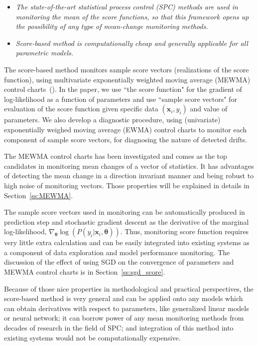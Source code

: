 \documentclass[twoside,11pt]{article}
\begin{document}
\begin{itemize}
\item
\textit{The state-of-the-art statistical process control (SPC) methods are used in monitoring the mean of the score functions, so that this framework opens up the possibility of any type of mean-change monitoring methods.}
\item
\textit{Score-based method is computationally cheap and generally applicable for all parametric models.}
\end{itemize}

The score-based method monitors sample score vectors  (realizations of the score function), using multivariate exponentially weighted moving average (MEWMA) control charts~(\cite{montgomery2007introduction}). In the paper, we use ``the score function" for the gradient of log-likelihood as a function of parameters and use ``sample score vectors" for evaluation of the score function given specific data $(\bm {x}_i,y_i)$ and value of parameters. {We also develop a diagnostic procedure, using (univariate) exponentially weighed moving average (EWMA) control charts to monitor each component of sample score vectors, for diagnosing the nature of detected drifts.}

The MEWMA control charts has been investigated and comes as the top candidates in monitoring mean changes of a vector of statistics. It has advantages of detecting the mean change in a direction invariant manner and being robust to high noise of monitoring vectors. Those properties will be explained in details in Section~\ref{ss:MEWMA}.

The sample score vectors used in monitoring can be automatically produced in prediction step and stochastic gradient descent as the derivative of the marginal log-likelihood, {$\nabla _{\bm { \theta}} \log(P (y_i|\bm {x}_i, \bm { \theta}))$}. Thus, monitoring score function requires very little extra calculation and can be easily integrated into existing systems as a component of data exploration and model performance monitoring. The discussion of the effect of using SGD on the convergence of parameters and MEWMA control charts is in Section~\ref{ss:sgd_score}.

Because of those nice properties in methodological and practical perspectives, the score-based method is very general and can be applied onto any models which can obtain derivatives with respect to parameters, like generalized linear models or neural network; it can borrow power of any mean monitoring methods from decades of research in the field of SPC; and integration of this method into existing systems would not be computationally expensive. 
\end{document}

